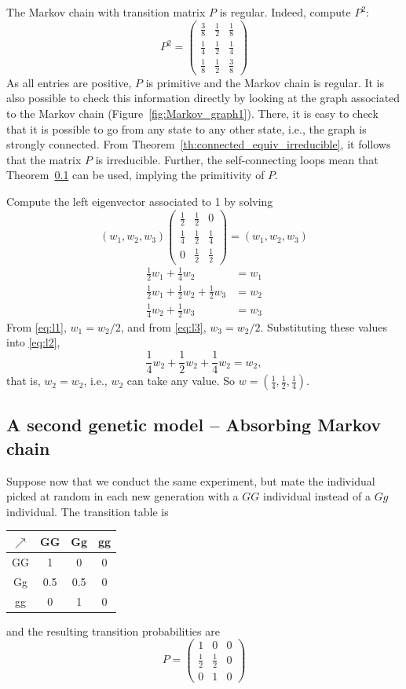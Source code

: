 The Markov chain with transition matrix $P$ is regular. Indeed, compute $P^2$:
\[
P^2=\left (
\begin{array}{ccc}
\frac 38 & \frac 12 & \frac 18 \\
\frac 14 & \frac 12 & \frac 14 \\
\frac 18 & \frac 12 & \frac 38
\end{array}\right)
\]
As all entries are positive, $P$ is primitive and the Markov chain is regular. It is also possible to check this information directly by looking at the graph associated to the Markov chain (Figure~\ref{fig:Markov_graph1}). There, it is easy to check that it is possible to go from any state to any other state, i.e., the graph is strongly connected. From Theorem~\ref{th:connected_equiv_irreducible}, it follows that the matrix $P$ is irreducible. Further, the self-connecting loops mean that Theorem~\ref{} can be used, implying the primitivity of $P$.

Compute the left eigenvector associated to 1 by solving
\[
(w_1,w_2,w_3)
\left (
\begin{array}{ccc}
\frac 12 & \frac 12 & 0 \\
\frac 14 & \frac 12 & \frac 14 \\
0 & \frac 12 & \frac 12
\end{array}\right)=(w_1,w_2,w_3)
\]
\begin{subequations}
\begin{align}
\frac 12 w_1+\frac 14 w_2 &= w_1 \label{eq:l1} \\
\frac 12 w_1+\frac 12 w_2+\frac 12 w_3 &= w_2 \label{eq:l2} \\
\frac 14 w_2+\frac 12 w_3 &= w_3 \label{eq:l3} 
\end{align}
\end{subequations}
From \eqref{eq:l1}, $w_1=w_2/2$, and from \eqref{eq:l3}, $w_3=w_2/2$. Substituting these values into \eqref{eq:l2},
\[
\frac 14 w_2+\frac 12 w_2 +\frac 14 w_2=w_2,
\]
that is, $w_2=w_2$, i.e., $w_2$ can take any value. So $w=(\frac 14,\frac 12,\frac 14)$.



\subsection{A second genetic model -- Absorbing Markov chain}
Suppose now that we conduct the same experiment, but mate the individual picked at random in each new generation with a $GG$ individual instead of a $Gg$ individual. The transition table is
\begin{center}
\begin{tabular}{c|ccc}
$\nearrow$ & GG & Gg & gg \\
\hline
GG & 1 & 0 & 0 \\
Gg & 0.5 & 0.5 & 0 \\
gg & 0 & 1 & 0
\end{tabular}
\end{center}
and the resulting transition probabilities are
\[
P=\left (
\begin{array}{ccc}
1 & 0 & 0 \\
\frac 12 & \frac 12 & 0 \\
0 & 1 & 0
\end{array}\right)
\]


